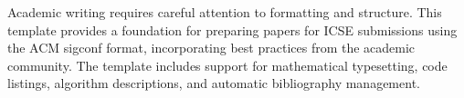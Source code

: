 
Academic writing requires careful attention to formatting and structure.
This template provides a foundation for preparing papers for ICSE submissions
using the ACM sigconf format, incorporating best practices from the academic community.
The template includes support for mathematical typesetting, code listings,
algorithm descriptions, and automatic bibliography management.
